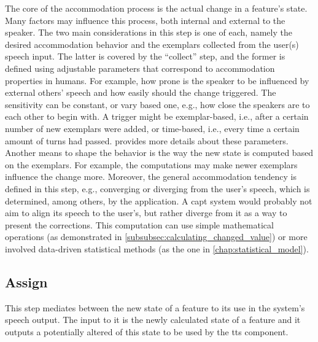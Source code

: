 The core of the accommodation process is the actual change in a feature's state.
Many factors may influence this process, both internal and external to the speaker.
The two main considerations in this step is one of each, namely the desired accommodation behavior and the exemplars collected from the user(s) speech input.
The latter is covered by the \enquote{collect} step, and the former is defined using adjustable parameters that correspond to accommodation properties in humans.
For example, how prone is the speaker to be influenced by external others' speech and how easily should the change triggered.
The sensitivity can be constant, or vary based one, e.g., how close the speakers are to each other to begin with.
A trigger might be exemplar-based, i.e., after a certain number of new exemplars were added, or time-based, i.e., every time a certain amount of turns had passed.
 provides more details about these parameters.
Another means to shape the behavior is the way the new state is computed based on the exemplars.
For example, the computations may make newer exemplars influence the change more.
Moreover, the general accommodation tendency is defined in this step, e.g., converging or diverging from the user's speech, which is determined, among others, by the application.
A \ac{capt} system would probably not aim to align its speech to the user's, but rather diverge from it as a way to present the corrections.
This computation can use simple mathematical operations (as demonstrated in \cref{subsubsec:calculating_changed_value}) or more involved data-driven statistical methods (as the one in \cref{chap:statistical_model}).

\subsection{Assign}
\label{subsec:assign}

This step mediates between the new state of a feature to its use in the system's speech output.
The input to it is the newly calculated state of a feature and it outputs a potentially altered of this state to be used by the \ac{tts} component.

